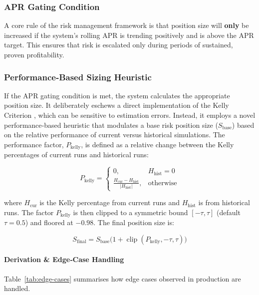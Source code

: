 \documentclass[10pt]{article}
\begin{document}
\subsubsection{APR Gating Condition}
A core rule of the risk management framework is that position size will \textbf{only} be increased if the system's rolling APR is trending positively and is above the APR target. This ensures that risk is escalated only during periods of sustained, proven profitability.

\subsubsection{Performance‑Based Sizing Heuristic}
If the APR gating condition is met, the system calculates the appropriate position size. It deliberately eschews a direct implementation of the Kelly Criterion \cite{kelly1956new,tharpinstitute_peak}, which can be sensitive to estimation errors. Instead, it employs a novel performance‑based heuristic that modulates a base risk position size ($S_{\text{base}}$) based on the relative performance of current versus historical simulations. The performance factor, $P_{\text{kelly}}$, is defined as a relative change between the Kelly percentages of current runs and historical runs:

\begin{equation}
\label{eq:kelly-performance}
P_{\text{kelly}} =
\begin{cases}
0, & H_{\text{hist}} = 0 \\[6pt]
\displaystyle
\frac{H_{\text{cur}} - H_{\text{hist}}}{\lvert H_{\text{hist}} \rvert},
& \text{otherwise}
\end{cases}
\end{equation}

where $H_{\text{cur}}$ is the Kelly percentage from current runs and $H_{\text{hist}}$ is from historical runs. The factor $P_{\text{kelly}}$ is then clipped to a symmetric bound $[-\tau,\tau]$ (default $\tau = 0.5$) and floored at $-0.98$. The final position size is:

\begin{equation}
\label{eq:kelly-adjusted}
S_{\text{final}} = S_{\text{base}} \bigl(1 + \operatorname{clip}(P_{\text{kelly}}, -\tau, \tau)\bigr)
\end{equation}

\paragraph{Derivation \& Edge‑Case Handling}
Table~\ref{tab:edge-cases} summarises how edge cases observed in production are handled.
\end{document}
